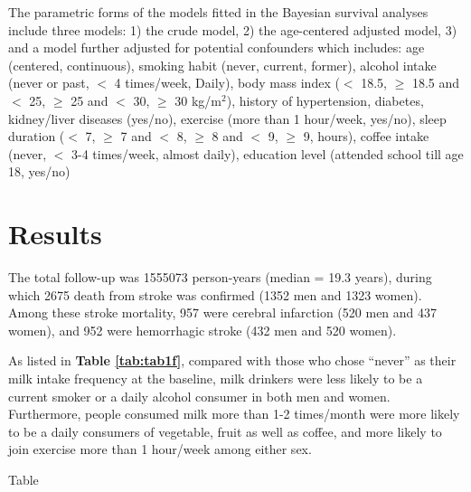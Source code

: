 \documentclass[nutrients,article,submit,moreauthors,pdftex]{mdpi}
\begin{document}
The parametric forms of the models fitted in the Bayesian survival
analyses include three models: 1) the crude model, 2) the age-centered
adjusted model, 3) and a model further adjusted for potential
confounders which includes: age (centered, continuous), smoking habit
(never, current, former), alcohol intake (never or past, \(<\) 4
times/week, Daily), body mass index (\(<\) 18.5, \(\geq\) 18.5 and \(<\)
25, \(\geq\) 25 and \(<\) 30, \(\geq\) 30 kg/m\(^2\)), history of
hypertension, diabetes, kidney/liver diseases (yes/no), exercise (more
than 1 hour/week, yes/no), sleep duration (\(<\) 7, \(\geq\) 7 and \(<\)
8, \(\geq\) 8 and \(<\) 9, \(\geq\) 9, hours), coffee intake (never,
\(<\) 3-4 times/week, almost daily), education level (attended school
till age 18, yes/no)

\hypertarget{results}{%
\section{Results}\label{results}}

The total follow-up was 1555073 person-years (median = 19.3 years),
during which 2675 death from stroke was confirmed (1352 men and 1323
women). Among these stroke mortality, 957 were cerebral infarction (520
men and 437 women), and 952 were hemorrhagic stroke (432 men and 520
women).

As listed in \textbf{Table \ref{tab:tab1f}}, compared with those who
chose ``never'' as their milk intake frequency at the baseline, milk
drinkers were less likely to be a current smoker or a daily alcohol
consumer in both men and women. Furthermore, people consumed milk more
than 1-2 times/month were more likely to be a daily consumers of
vegetable, fruit as well as coffee, and more likely to join exercise
more than 1 hour/week among either sex.

Table
\end{document}
